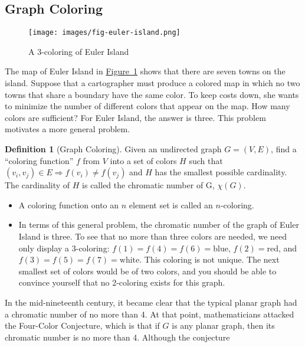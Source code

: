 \documentclass[10pt,]{book}
\theoremstyle{plain}
\theoremstyle{definition}
\newtheorem{definition}[theorem]{Definition}
\theoremstyle{definition}
\theoremstyle{definition}
\theoremstyle{definition}
\theoremstyle{definition}
\numberwithin{equation}{section}
\begin{document}
\subsection[Graph Coloring]{Graph Coloring}\label{ss-graph-coloring}
\leavevmode%
\begin{figure}
\centering
\texttt{[image: images/fig-euler-island.png]}
\caption{A 3-coloring of Euler Island
                \label{fig-euler-island}}
\end{figure}
The map of Euler Island in \hyperref[fig-euler-island]{Figure~\ref{fig-euler-island}} shows that there are seven towns on the island. Suppose that a cartographer must produce a colored map in
which no two towns that share a boundary have the same color. To keep costs down, she wants to minimize the number of different colors that appear
on the map. How many colors are sufficient? For Euler Island, the answer is three. This problem motivates a more general problem.%
\begin{definition}[Graph Coloring]\label{def-graph-coloring}
\label{notation-7}
Given an undirected graph \(G = (V, E)\), find a ``coloring function'' \(f\) from \(V\) into a
set of colors \(H\) such that \(\left(v_i,v_j\right)\in E \Rightarrow  f\left(v_i\right)\neq f\left(v_j\right)\) and \(H\) has the smallest
possible cardinality. The cardinality of \(H\) is called the  chromatic number of G, \(\chi(G)\).%
\end{definition}
\par
\leavevmode%
\begin{itemize}[label=\textbullet]
\item{} A coloring function onto an \(n\) element set is called an \(n\)-coloring.%
\item{} In terms of this general problem, the chromatic number of the graph of Euler Island is three. To see that no more than three colors are needed,
we need only display a 3-coloring: \(f(1) = f(4) = f(6) = \text{blue}\), \(f(2) = \text{red}\), and \(f(3) = f(5) = f(7) = \text{white}\). This coloring
is not unique. The next smallest set of colors would be of two colors, and you should be able to convince yourself that no 2-coloring exists for
this graph.
%
\end{itemize}
%
\par
In the mid-nineteenth century, it became clear that the typical planar graph had a chromatic number of no more than 4. At that point, mathematicians
attacked the Four-Color Conjecture, which is that if \(G\) is any planar graph, then its chromatic number is no more than 4. Although the conjecture
\end{document}
